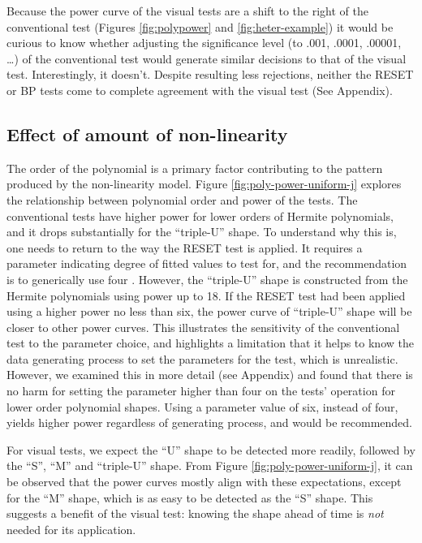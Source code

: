 \documentclass[]{interact}
\theoremstyle{plain}%
\theoremstyle{definition}
\theoremstyle{remark}
\begin{document}
Because the power curve of the visual tests are a shift to the right of
the conventional test (Figures \ref{fig:polypower} and
\ref{fig:heter-example}) it would be curious to know whether adjusting
the significance level (to .001, .0001, .00001, \ldots) of the
conventional test would generate similar decisions to that of the visual
test. Interestingly, it doesn't. Despite resulting less rejections,
neither the RESET or BP tests come to complete agreement with the visual
test (See Appendix).

\hypertarget{effect-of-amount-of-non-linearity}{%
\subsection{\texorpdfstring{Effect of amount of
non-linearity\label{nonlin-analysis}}{Effect of amount of non-linearity}}\label{effect-of-amount-of-non-linearity}}

The order of the polynomial is a primary factor contributing to the
pattern produced by the non-linearity model. Figure
\ref{fig:poly-power-uniform-j} explores the relationship between
polynomial order and power of the tests. The conventional tests have
higher power for lower orders of Hermite polynomials, and it drops
substantially for the ``triple-U'' shape. To understand why this is, one
needs to return to the way the RESET test is applied. It requires a
parameter indicating degree of fitted values to test for, and the
recommendation is to generically use four \citep{ramsey_tests_1969}.
However, the ``triple-U'' shape is constructed from the Hermite
polynomials using power up to 18. If the RESET test had been applied
using a higher power no less than six, the power curve of ``triple-U''
shape will be closer to other power curves. This illustrates the
sensitivity of the conventional test to the parameter choice, and
highlights a limitation that it helps to know the data generating
process to set the parameters for the test, which is unrealistic.
However, we examined this in more detail (see Appendix) and found that
there is no harm for setting the parameter higher than four on the
tests' operation for lower order polynomial shapes. Using a parameter
value of six, instead of four, yields higher power regardless of
generating process, and would be recommended.

For visual tests, we expect the ``U'' shape to be detected more readily,
followed by the ``S'', ``M'' and ``triple-U'' shape. From Figure
\ref{fig:poly-power-uniform-j}, it can be observed that the power curves
mostly align with these expectations, except for the ``M'' shape, which
is as easy to be detected as the ``S'' shape. This suggests a benefit of
the visual test: knowing the shape ahead of time is \emph{not} needed
for its application.
\end{document}
